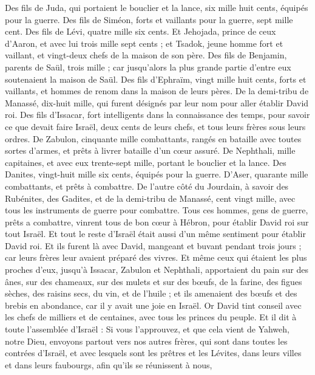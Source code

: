 \begin{multicols}{2}
Des fils de Juda, qui portaient le bouclier et la lance, six mille huit cents, équipés pour la guerre.
Des fils de Siméon, forts et vaillants pour la guerre, sept mille cent.
Des fils de Lévi, quatre mille six cents.
Et Jehojada, prince de ceux d'Aaron, et avec lui trois mille sept cents ;
et Tsadok, jeune homme fort et vaillant, et vingt-deux chefs de la maison de son père.
Des fils de Benjamin, parents de Saül, trois mille ; car jusqu'alors la plus grande partie d'entre eux soutenaient la maison de Saül.
Des fils d'Ephraïm, vingt mille huit cents, forts et vaillants, et hommes de renom dans la maison de leurs pères.
De la demi-tribu de Manassé, dix-huit mille, qui furent désignés par leur nom pour aller établir David roi.
Des fils d'Issacar, fort intelligents dans la connaissance des temps, pour savoir ce que devait faire Israël, deux cents de leurs chefs, et tous leurs frères sous leurs ordres.
De Zabulon, cinquante mille combattants, rangés en bataille avec toutes sortes d'armes, et prêts à livrer bataille d'un cœur assuré.
De Nephthali, mille capitaines, et avec eux trente-sept mille, portant le bouclier et la lance.
Des Danites, vingt-huit mille six cents, équipés pour la guerre.
D'Aser, quarante mille combattants, et prêts à combattre.
De l'autre côté du Jourdain, à savoir des Rubénites, des Gadites, et de la demi-tribu de Manassé, cent vingt mille, avec tous les instruments de guerre pour combattre.
Tous ces hommes, gens de guerre, prêts a combattre, vinrent tous de bon cœur à Hébron, pour établir David roi sur tout Israël. Et tout le reste d'Israël était aussi d'un même sentiment pour établir David roi.
Et ils furent là avec David, mangeant et buvant pendant trois jours ; car leurs frères leur avaient préparé des vivres.
Et même ceux qui étaient les plus proches d'eux, jusqu'à Issacar, Zabulon et Nephthali, apportaient du pain sur des ânes, sur des chameaux, sur des mulets et sur des bœufs, de la farine, des figues sèches, des raisins secs, du vin, et de l'huile ; et ils amenaient des bœufs et des brebis en abondance, car il y avait une joie en Israël.
\VerseOne{}Or David tint conseil avec les chefs de milliers et de centaines, avec tous les princes du peuple.
Et il dit à toute l'assemblée d'Israël : Si vous l'approuvez, et que cela vient de Yahweh, notre Dieu, envoyons partout vers nos autres frères, qui sont dans toutes les contrées d'Israël, et avec lesquels sont les prêtres et les Lévites, dans leurs villes et dans leurs faubourgs, afin qu'ils se réunissent à nous,

\end{multicols}
